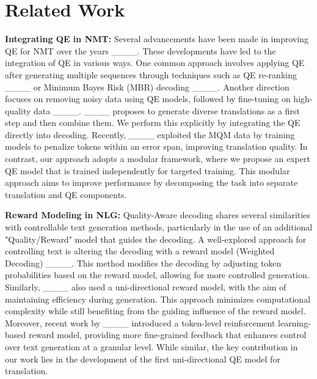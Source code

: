 \section{Related Work}
\textbf{Integrating QE in NMT:} Several advancements have been made in improving QE for NMT over the years ____. These developments have led to the integration of QE in various ways.
One common approach involves applying QE after generating multiple sequences through techniques such as QE re-ranking ____ or Minimum Bayes Risk (MBR) decoding ____. Another direction focuses on removing noisy data using QE models, followed by fine-tuning on high-quality data ____. ____ proposes to generate diverse translations as a first step and then combine them. We perform this explicitly by integrating the QE directly into decoding.
Recently, ____ exploited the MQM data by training models to penalize tokens within an error span, improving translation quality. In contrast, our approach adopts a modular framework, where we propose an expert QE model that is trained independently for targeted training. This modular approach aims to improve performance by decomposing the task into separate translation and QE components.

\textbf{Reward Modeling in NLG:}  Quality-Aware decoding shares several similarities with controllable text generation methods, particularly in the use of an additional "Quality/Reward" model that guides the decoding. A well-explored approach for controlling text is altering the decoding with a reward model (Weighted Decoding) ____. This method modifies the decoding by adjusting token probabilities based on the reward model, allowing for more controlled generation.
Similarly, ____ also used a uni-directional reward model, with the aim of maintaining efficiency during generation. This approach minimizes computational complexity while still benefiting from the guiding influence of the reward model. Moreover, recent work by ____ introduced a token-level reinforcement learning-based reward model, providing more fine-grained feedback that enhances control over text generation at a granular level. While similar, the key contribution in our work lies in the development of the first uni-directional QE model for translation.
